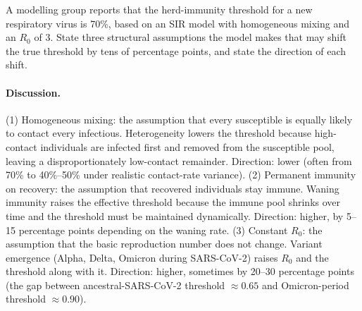 \begin{exercise}
A modelling group reports that the herd-immunity threshold for a new
respiratory virus is 70\%, based on an SIR model with homogeneous
mixing and an $R_0$ of 3. State three structural assumptions the
model makes that may shift the true threshold by tens of
percentage points, and state the direction of each shift.

\paragraph{Discussion.} (1) Homogeneous mixing: the assumption that
every susceptible is equally likely to contact every infectious.
Heterogeneity lowers the threshold because high-contact individuals
are infected first and removed from the susceptible pool, leaving a
disproportionately low-contact remainder. Direction: lower (often
from 70\% to 40\%--50\% under realistic contact-rate variance).
(2) Permanent immunity on recovery: the assumption that recovered
individuals stay immune. Waning immunity raises the effective
threshold because the immune pool shrinks over time and the threshold
must be maintained dynamically. Direction: higher, by 5--15 percentage
points depending on the waning rate. (3) Constant $R_0$: the
assumption that the basic reproduction number does not change.
Variant emergence (Alpha, Delta, Omicron during SARS-CoV-2)
raises $R_0$ and the threshold along with it. Direction: higher,
sometimes by 20--30 percentage points (the gap between
ancestral-SARS-CoV-2 threshold $\approx 0.65$ and Omicron-period
threshold $\approx 0.90$).
\end{exercise}

